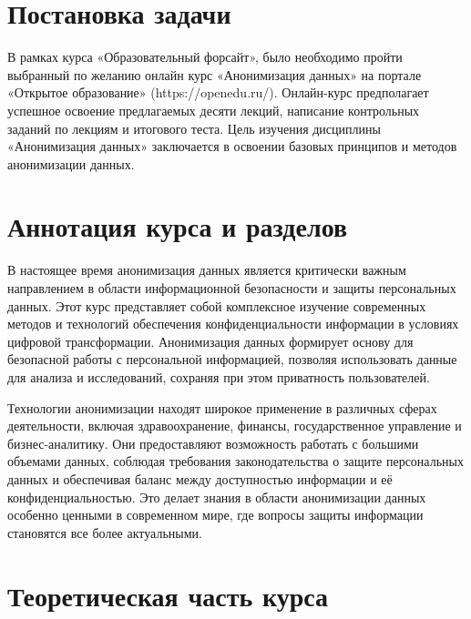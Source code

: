 \documentclass[areasetadvanced]{scrartcl}
\begin{document}
\newpage
\section{Постановка задачи}
В рамках курса «Образовательный форсайт», было необходимо пройти выбранный по желанию
онлайн курс «Анонимизация данных» на портале «Открытое
образование» (https://openedu.ru/).
Онлайн-курс предполагает успешное освоение предлагаемых десяти лекций, написание
контрольных заданий по лекциям и итогового теста.
Цель изучения дисциплины «Анонимизация данных»
заключается в освоении базовых принципов и методов анонимизации данных.

\newpage
\section{Аннотация курса и разделов}
В настоящее время анонимизация данных является критически важным направлением в области информационной безопасности и защиты персональных данных. 
Этот курс представляет собой комплексное изучение современных методов и технологий обеспечения конфиденциальности информации в условиях цифровой трансформации. 
Анонимизация данных формирует основу для безопасной работы с персональной информацией, 
позволяя использовать данные для анализа и исследований, сохраняя при этом приватность пользователей.

Технологии анонимизации находят широкое применение в различных сферах деятельности, включая здравоохранение, финансы, государственное управление и бизнес-аналитику. 
Они предоставляют возможность работать с большими объемами данных, соблюдая требования законодательства о защите персональных данных и 
обеспечивая баланс между доступностью информации и её конфиденциальностью. 
Это делает знания в области анонимизации данных особенно ценными в современном мире, где вопросы защиты информации становятся все более актуальными.

\newpage
\section{Теоретическая часть курса}
\end{document}
